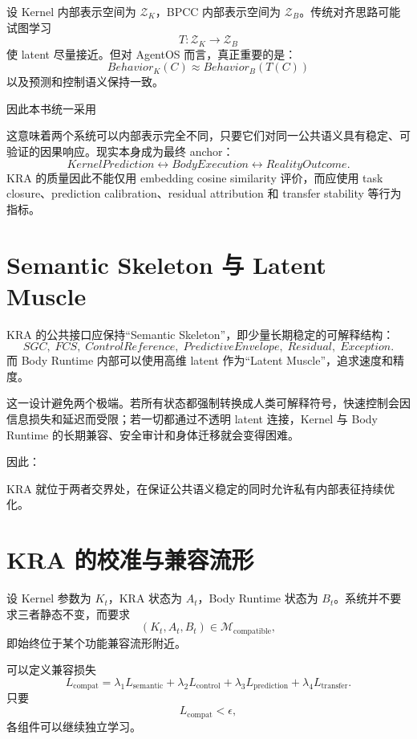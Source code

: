 设 Kernel 内部表示空间为 $\mathcal Z_K$，BPCC 内部表示空间为 $\mathcal Z_B$。传统对齐思路可能试图学习
\[
T:\mathcal Z_K\rightarrow\mathcal Z_B
\]
使 latent 尽量接近。但对 AgentOS 而言，真正重要的是：
\[
Behavior_K(C)
\approx
Behavior_B(T(C))
\]
以及预测和控制语义保持一致。

因此本书统一采用
\begin{statementbox}
\centering
{}
\end{statementbox}

这意味着两个系统可以内部表示完全不同，只要它们对同一公共语义具有稳定、可验证的因果响应。现实本身成为最终 anchor：
\[
KernelPrediction
\leftrightarrow
BodyExecution
\leftrightarrow
RealityOutcome.
\]
KRA 的质量因此不能仅用 embedding cosine similarity 评价，而应使用 task closure、prediction calibration、residual attribution 和 transfer stability 等行为指标。

\section{Semantic Skeleton 与 Latent Muscle}

KRA 的公共接口应保持“Semantic Skeleton”，即少量长期稳定的可解释结构：
\[
SGC,\;
FCS,\;
ControlReference,\;
PredictiveEnvelope,\;
Residual,\;
Exception.
\]
而 Body Runtime 内部可以使用高维 latent 作为“Latent Muscle”，追求速度和精度。

这一设计避免两个极端。若所有状态都强制转换成人类可解释符号，快速控制会因信息损失和延迟而受限；若一切都通过不透明 latent 连接，Kernel 与 Body Runtime 的长期兼容、安全审计和身体迁移就会变得困难。

因此：
\begin{statementbox}
\centering
{}
\end{statementbox}
KRA 就位于两者交界处，在保证公共语义稳定的同时允许私有内部表征持续优化。

\section{KRA 的校准与兼容流形}

设 Kernel 参数为 $K_t$，KRA 状态为 $A_t$，Body Runtime 状态为 $B_t$。系统并不要求三者静态不变，而要求
\[
(K_t,A_t,B_t)
\in
\mathcal M_{\mathrm{compatible}},
\]
即始终位于某个功能兼容流形附近。

可以定义兼容损失
\[
L_{\mathrm{compat}}
=
\lambda_1L_{\mathrm{semantic}}
+
\lambda_2L_{\mathrm{control}}
+
\lambda_3L_{\mathrm{prediction}}
+
\lambda_4L_{\mathrm{transfer}}.
\]
只要
\[
L_{\mathrm{compat}}<\epsilon,
\]
各组件可以继续独立学习。

